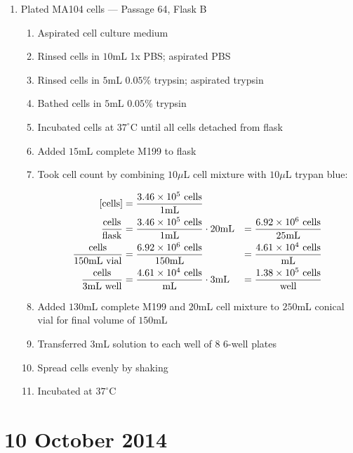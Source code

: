\begin{enumerate}
	\item Plated MA104 cells --- Passage 64, Flask B
		\begin{enumerate}
			\item Aspirated cell culture medium
			\item Rinsed cells in $10$mL 1x PBS; aspirated PBS
			\item Rinsed cells in $5$mL $0.05$\% trypsin; aspirated trypsin
			\item Bathed cells in $5$mL $0.05$\% trypsin
			\item Incubated cells at $37^{\circ}$C until all cells detached from flask
			\item Added $15$mL complete M199 to flask\
			\item Took cell count by combining $10\mu$L cell mixture with $10\mu$L trypan blue:
			
				\begin{align*}
				\text{[cells]} &= \frac{3.46\times 10^{5}\text{ cells}}{1\text{mL}} \\
				\frac{\text{cells}}{\text{flask}} &= \frac{3.46\times 10^{5}\text{ cells}}{1\text{mL}} \cdot 20\text{mL} &= \frac{6.92\times 10^{6}\text{ cells}}{25\text{mL}}\\
				\frac{\text{cells}}{150\text{mL vial}} &= \frac{6.92\times 10^{6}\text{ cells}}{150\text{mL}} &= \frac{4.61\times 10^{4}\text{ cells}}{\text{mL}}\\
				\frac{\text{cells}}{3\text{mL well}} &= \frac{4.61\times 10^{4}\text{ cells}}{\text{mL}} \cdot 3\text{mL} &= \frac{1.38\times 10^{5}\text{ cells}}{\text{well}}\\
				\end{align*}
			\item Added $130$mL complete M199 and $20$mL cell mixture to $250$mL conical vial for final volume of $150$mL
			\item Transferred $3$mL solution to each well of 8 6-well plates
			\item Spread cells evenly by shaking
			\item Incubated at $37^{\circ}$C
		\end{enumerate}

\end{enumerate}

%

\section*{10 October 2014}

